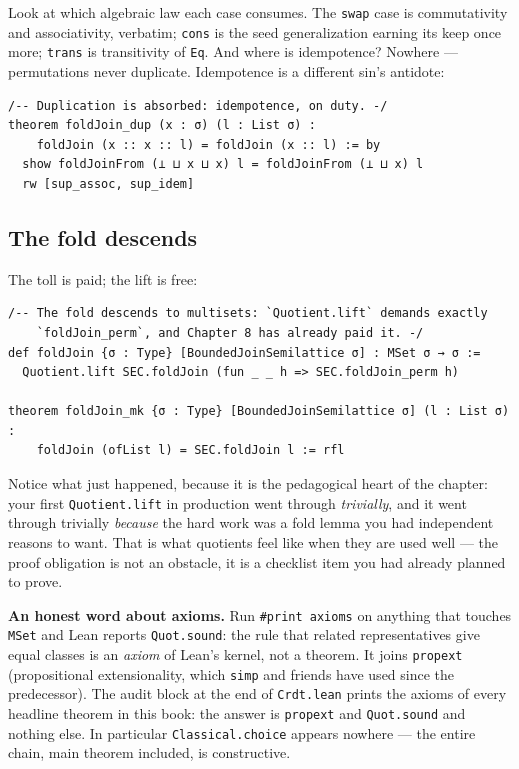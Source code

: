 \documentclass[12pt, a4paper, openright]{book}
\theoremstyle{thmstyle}
\theoremstyle{defstyle}
\newcommand{\lc}[1]{\texttt{#1}}
\newenvironment{notebox}{%
  \begin{tcolorbox}[notebox]%
}{\end{tcolorbox}}
\begin{document}
Look at which algebraic law each case consumes. The \lc{swap} case is
commutativity and associativity, verbatim; \lc{cons} is the seed
generalization earning its keep once more; \lc{trans} is transitivity of
\lc{Eq}. And where is idempotence? Nowhere --- permutations never
duplicate. Idempotence is a different sin's antidote:

\begin{verbatim}
/-- Duplication is absorbed: idempotence, on duty. -/
theorem foldJoin_dup (x : σ) (l : List σ) :
    foldJoin (x :: x :: l) = foldJoin (x :: l) := by
  show foldJoinFrom (⊥ ⊔ x ⊔ x) l = foldJoinFrom (⊥ ⊔ x) l
  rw [sup_assoc, sup_idem]
\end{verbatim}

\subsection{The fold descends}

The toll is paid; the lift is free:

\begin{verbatim}
/-- The fold descends to multisets: `Quotient.lift` demands exactly
    `foldJoin_perm`, and Chapter 8 has already paid it. -/
def foldJoin {σ : Type} [BoundedJoinSemilattice σ] : MSet σ → σ :=
  Quotient.lift SEC.foldJoin (fun _ _ h => SEC.foldJoin_perm h)

theorem foldJoin_mk {σ : Type} [BoundedJoinSemilattice σ] (l : List σ) :
    foldJoin (ofList l) = SEC.foldJoin l := rfl
\end{verbatim}

Notice what just happened, because it is the pedagogical heart of the
chapter: your first \lc{Quotient.lift} in production went through
\emph{trivially}, and it went through trivially \emph{because} the hard
work was a fold lemma you had independent reasons to want. That is what
quotients feel like when they are used well --- the proof obligation is
not an obstacle, it is a checklist item you had already planned to prove.

\begin{notebox}
  \textbf{An honest word about axioms.} Run \texttt{\#print axioms} on
  anything that touches \lc{MSet} and Lean reports \lc{Quot.sound}: the
  rule that related representatives give equal classes is an
  \emph{axiom} of Lean's kernel, not a theorem. It joins \lc{propext}
  (propositional extensionality, which \lc{simp} and friends have used
  since the predecessor). The audit block at the end of
  \texttt{Crdt.lean} prints the axioms of every headline theorem in this
  book: the answer is \lc{propext} and \lc{Quot.sound} and nothing else.
  In particular \lc{Classical.choice} appears nowhere --- the entire
  chain, main theorem included, is constructive.
\end{notebox}
\end{document}
